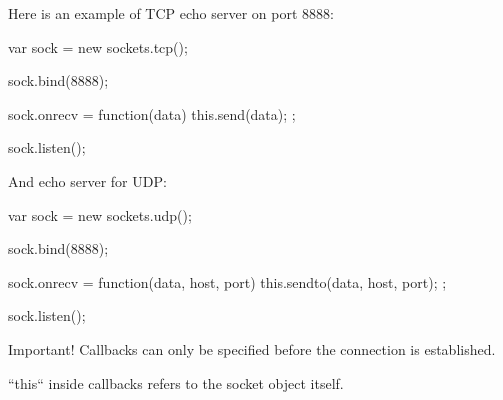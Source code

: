 Here is an example of TCP echo server on port 8888:

\begin{listingverbatim}
var sock = new sockets.tcp();

sock.bind(8888);

sock.onrecv = function(data) {
    this.send(data);
};

sock.listen();
\end{listingverbatim}

And echo server for UDP:
\begin{listingverbatim}
var sock = new sockets.udp();

sock.bind(8888);

sock.onrecv = function(data, host, port) {
    this.sendto(data, host, port);
};

sock.listen();
\end{listingverbatim}

Important! Callbacks can only be specified before the connection is established.

``this`` inside callbacks refers to the socket object itself.

